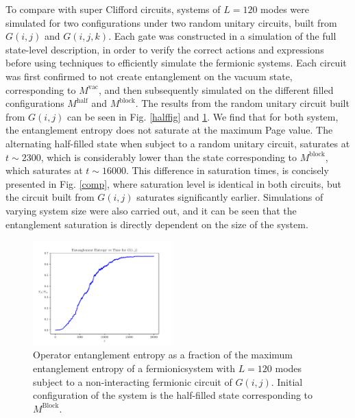 To compare with super Clifford circuits, systems of $L = 120$ modes were simulated for two configurations under two random unitary circuits, built from $G(i, j)$ and $G(i, j, k)$. 
Each gate was constructed in a simulation of the full state-level description, in order to verify the correct actions and expressions before using techniques to efficiently simulate the fermionic systems. 
 Each circuit was first confirmed to not create entanglement on the vacuum state, corresponding to $M^{\text{vac}}$, and then subsequently simulated on the different filled configurations $M^{\text{half}}$ and $M^{\text{block}}$. The results from the random unitary circuit built from $G(i, j)$ can be seen in Fig. \ref{halffig} and \ref{blockstate}. We find that for both system, the entanglement entropy does not saturate at the maximum Page value. The alternating half-filled state when subject to a random unitary circuit, saturates at $t\sim 2300$, which is considerably lower than the state corresponding to $M^{\text{block}}$, which saturates at $t \sim 16000$. This difference in saturation times, is concisely presented in Fig. \ref{comp}, where saturation level is identical in both circuits, but the circuit built from $G(i, j)$ saturates significantly earlier. Simulations of varying system size were also carried out, and it can be seen that the entanglement saturation is directly dependent on the size of the system. 
\begin{figure}[t!]
    
    \centering
    \includegraphics[width=0.48\textwidth]{reportimages/GFerm120.pdf}
    \caption{Operator entanglement entropy as a fraction of the maximum entanglement entropy of a fermionicsystem with $L = 120$ modes subject to a non-interacting fermionic circuit of $G(i, j)$. Initial configuration of the system is the half-filled state corresponding to $M^{\text{Block}}$. }
    \label{blockstate}
\end{figure}







